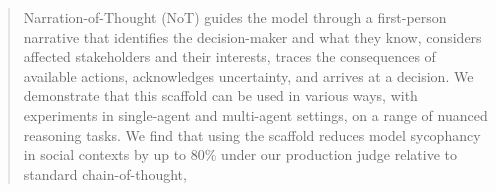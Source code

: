 \begin{abstract}
 Narration-of-Thought (NoT) guides the model through a first-person narrative that identifies the decision-maker and what they know, considers affected stakeholders and their interests, traces the consequences of available actions, acknowledges uncertainty, and arrives at a decision. We demonstrate that this scaffold can be used in various ways, with experiments in single-agent and multi-agent settings, on a range of nuanced reasoning tasks. We find that using the scaffold reduces model sycophancy in social contexts by up to 80\% under our production judge relative to standard chain-of-thought,

\end{abstract}
